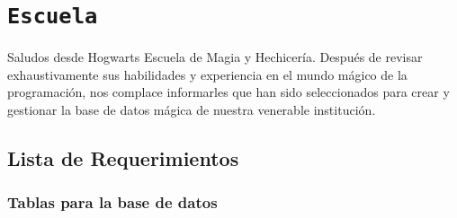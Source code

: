 \section{\texttt{Escuela}}

Saludos desde Hogwarts Escuela de Magia y Hechicería. Después de revisar exhaustivamente sus habilidades y
experiencia en el mundo mágico de la programación, nos complace informarles que han sido seleccionados para 
crear y gestionar la base de datos mágica de nuestra venerable institución.

\subsection{Lista de Requerimientos}

\subsubsection*{Tablas para la base de datos}

